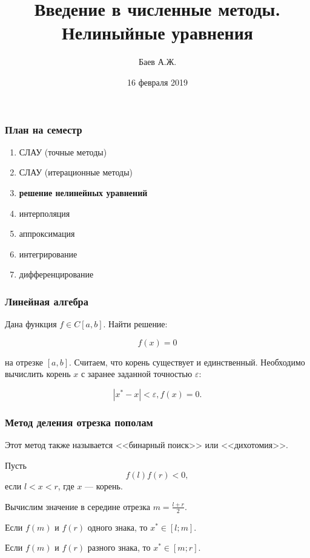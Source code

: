\documentclass[10pt]{beamer}
\author{Баев А.Ж.}
\title{Введение в численные методы. \\ Нелиныйные уравнения}
\institute{Казахстанский филиал МГУ}
\date{16 февраля 2019}
\begin{document}
\maketitle


\begin{frame}[fragile]
\frametitle{План на семестр}

\begin{enumerate}
\item СЛАУ (точные методы)
\item СЛАУ (итерационные методы)
\item \textbf{решение нелинейных уравнений}
\item интерполяция 
\item аппроксимация
\item интегрирование
\item дифференцирование
\end{enumerate}

\end{frame}


\begin{frame}[fragile]
\frametitle{Линейная алгебра}

Дана функция $f \in C[a, b]$. Найти решение:

$$f(x) = 0$$

на отрезке $[a, b]$. Считаем, что корень существует и единственный. Необходимо вычислить корень $x$ с заранее заданной точностью $\varepsilon$:

$$|x^{*} - x| < \varepsilon, f(x) = 0.$$

\end{frame}


\begin{frame}[fragile]
\frametitle{Метод деления отрезка пополам}

Этот метод также называется <<бинарный поиск>> или <<дихотомия>>.

Пусть
$$f(l) f(r) < 0,$$
если $l < x < r$, где $x$ --- корень. 

\vfill
Вычислим значение в середине отрезка $m = \frac{l+r}{2}$. 

\vfill

Если $f(m)$ и $f(r)$ одного знака, то $x^* \in [l; m]$.

\vfill

Если $f(m)$ и $f(r)$ разного знака, то $x^* \in [m; r]$.

\vfill
\end{frame}
\end{document}
